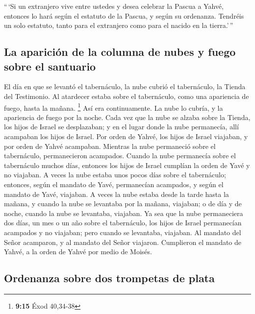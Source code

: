  ``\,`Si un extranjero vive entre ustedes y desea
celebrar la Pascua a Yahvé, entonces lo hará según el estatuto de la
Pascua, y según su ordenanza. Tendréis un solo estatuto, tanto para el
extranjero como para el nacido en la tierra.'\,''

\hypertarget{la-apariciuxf3n-de-la-columna-de-nubes-y-fuego-sobre-el-santuario}{%
\subsection{La aparición de la columna de nubes y fuego sobre el
santuario}\label{la-apariciuxf3n-de-la-columna-de-nubes-y-fuego-sobre-el-santuario}}

 El día en que se levantó el tabernáculo, la nube cubrió
el tabernáculo, la Tienda del Testimonio. Al atardecer estaba sobre el
tabernáculo, como una apariencia de fuego, hasta la mañana. \footnote{\textbf{9:15}
  Éxod 40,34-38}  Así era continuamente. La nube lo
cubría, y la apariencia de fuego por la noche.  Cada vez
que la nube se alzaba sobre la Tienda, los hijos de Israel se
desplazaban; y en el lugar donde la nube permanecía, allí acampaban los
hijos de Israel.  Por orden de Yahvé, los hijos de Israel
viajaban, y por orden de Yahvé acampaban. Mientras la nube permaneció
sobre el tabernáculo, permanecieron acampados.  Cuando la
nube permanecía sobre el tabernáculo muchos días, entonces los hijos de
Israel cumplían la orden de Yavé y no viajaban.  A veces
la nube estaba unos pocos días sobre el tabernáculo; entonces, según el
mandato de Yavé, permanecían acampados, y según el mandato de Yavé,
viajaban.  A veces la nube estaba desde la tarde hasta la
mañana, y cuando la nube se levantaba por la mañana, viajaban; o de día
y de noche, cuando la nube se levantaba, viajaban.  Ya
sea que la nube permaneciera dos días, un mes o un año sobre el
tabernáculo, los hijos de Israel permanecían acampados y no viajaban;
pero cuando se levantaba, viajaban.  Al mandato del Señor
acamparon, y al mandato del Señor viajaron. Cumplieron el mandato de
Yahvé, a la orden de Yahvé por medio de Moisés.

\hypertarget{ordenanza-sobre-dos-trompetas-de-plata}{%
\subsection{Ordenanza sobre dos trompetas de
plata}\label{ordenanza-sobre-dos-trompetas-de-plata}}

